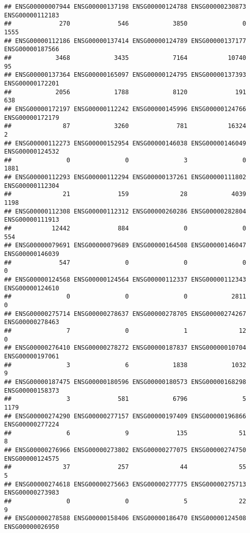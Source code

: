 \documentclass[
]{article}
\begin{document}
\begin{verbatim}
## ENSG00000007944 ENSG00000137198 ENSG00000124788 ENSG00000230873 ENSG00000112183 
##             270             546            3850               0            1555 
## ENSG00000112186 ENSG00000137414 ENSG00000124789 ENSG00000137177 ENSG00000187566 
##            3468            3435            7164           10740              95 
## ENSG00000137364 ENSG00000165097 ENSG00000124795 ENSG00000137393 ENSG00000172201 
##            2056            1788            8120             191             638 
## ENSG00000172197 ENSG00000112242 ENSG00000145996 ENSG00000124766 ENSG00000172179 
##              87            3260             781           16324               2 
## ENSG00000112273 ENSG00000152954 ENSG00000146038 ENSG00000146049 ENSG00000124532 
##               0               0               3               0            1881 
## ENSG00000112293 ENSG00000112294 ENSG00000137261 ENSG00000111802 ENSG00000112304 
##              21             159              28            4039            1198 
## ENSG00000112308 ENSG00000112312 ENSG00000260286 ENSG00000282804 ENSG00000111913 
##           12442             884               0               0             554 
## ENSG00000079691 ENSG00000079689 ENSG00000164508 ENSG00000146047 ENSG00000146039 
##             547               0               0               0               0 
## ENSG00000124568 ENSG00000124564 ENSG00000112337 ENSG00000112343 ENSG00000124610 
##               0               0               0            2811               0 
## ENSG00000275714 ENSG00000278637 ENSG00000278705 ENSG00000274267 ENSG00000278463 
##               7               0               1              12               0 
## ENSG00000276410 ENSG00000278272 ENSG00000187837 ENSG00000010704 ENSG00000197061 
##               3               6            1838            1032               9 
## ENSG00000187475 ENSG00000180596 ENSG00000180573 ENSG00000168298 ENSG00000158373 
##               3             581            6796               5            1179 
## ENSG00000274290 ENSG00000277157 ENSG00000197409 ENSG00000196866 ENSG00000277224 
##               6               9             135              51               8 
## ENSG00000276966 ENSG00000273802 ENSG00000277075 ENSG00000274750 ENSG00000124575 
##              37             257              44              55               5 
## ENSG00000274618 ENSG00000275663 ENSG00000277775 ENSG00000275713 ENSG00000273983 
##               0               0               5              22               9 
## ENSG00000278588 ENSG00000158406 ENSG00000186470 ENSG00000124508 ENSG00000026950 

\end{verbatim}
\end{document}
